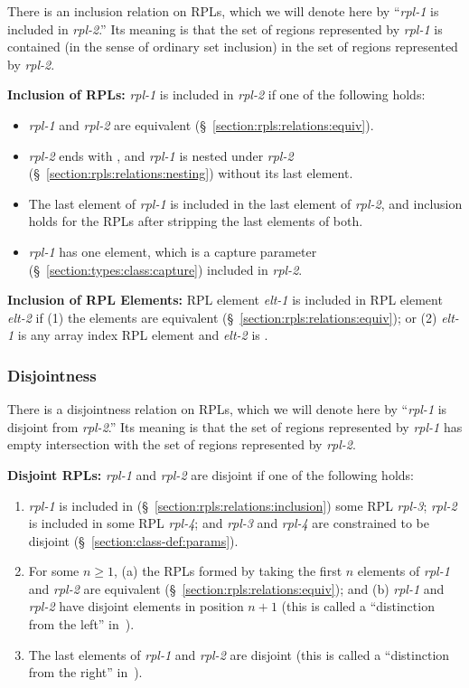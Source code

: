 There is an inclusion relation on RPLs, which we will denote here by
``\emph{rpl-1} is included in \emph{rpl-2}.''  Its meaning is that the
set of regions represented by \emph{rpl-1} is contained (in the sense
of ordinary set inclusion) in the set of regions represented by
\emph{rpl-2}.

\noindent
\textbf{Inclusion of RPLs:} \emph{rpl-1} is included in \emph{rpl-2}
if one of the following holds:
%
\begin{itemize}
%
\item \emph{rpl-1} and \emph{rpl-2} are equivalent
  (\S~\ref{section:rpls:relations:equiv}).
%
\item \emph{rpl-2} ends with \kwd{*}, and \emph{rpl-1} is nested under
  \emph{rpl-2} (\S~\ref{section:rpls:relations:nesting}) without its last element.
%
\item The last element of \emph{rpl-1} is included in the last element
  of \emph{rpl-2}, and inclusion holds for the RPLs after stripping
  the last elements of both.
%
\item \emph{rpl-1} has one element, which is a capture parameter
  (\S~\ref{section:types:class:capture}) included in \emph{rpl-2}.
%
\end{itemize}
%

\noindent
\textbf{Inclusion of RPL Elements:} RPL element \emph{elt-1} is
included in RPL element \emph{elt-2} if (1) the elements are
equivalent (\S~\ref{section:rpls:relations:equiv}); or (2) \emph{elt-1}
is any array index RPL element and \emph{elt-2} is \kwd{[?]}.


\subsubsection{Disjointness}
\label{section:rpls:relations:disjoint}

There is a disjointness relation on RPLs, which we will denote here by
``\emph{rpl-1} is disjoint from \emph{rpl-2}.''  Its meaning is that
the set of regions represented by \emph{rpl-1} has empty intersection
with the set of regions represented by \emph{rpl-2}.

\noindent
\textbf{Disjoint RPLs:} \emph{rpl-1} and \emph{rpl-2} are disjoint if
one of the following holds:
%
\begin{enumerate}
%
\item \emph{rpl-1} is included in
  (\S~\ref{section:rpls:relations:inclusion}) some RPL \emph{rpl-3};
  \emph{rpl-2} is included in some RPL \emph{rpl-4}; and \emph{rpl-3}
  and \emph{rpl-4} are constrained to be disjoint
  (\S~\ref{section:class-def:params}).
%
\item For some $n \geq 1$, (a) the RPLs formed by taking the first $n$
  elements of \emph{rpl-1} and \emph{rpl-2} are equivalent
  (\S~\ref{section:rpls:relations:equiv}); and (b) \emph{rpl-1} and
  \emph{rpl-2} have disjoint elements in position $n+1$ (this is
  called a ``distinction from the left'' in~\cite{DPJ:OOPSLA09}).
%
\item The last elements of \emph{rpl-1} and \emph{rpl-2} are disjoint
  (this is called a ``distinction from the right''
  in~\cite{DPJ:OOPSLA09}).
%
\end{enumerate}

